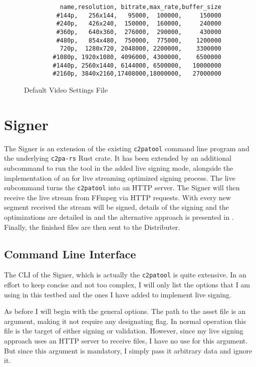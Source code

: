 \begin{figure}
    \centering
    \begin{lstlisting}
          name,resolution, bitrate,max_rate,buffer_size
         #144p,   256x144,   95000,  100000,     150000
         #240p,   426x240,  150000,  160000,     240000
         #360p,   640x360,  276000,  290000,     430000
         #480p,   854x480,  750000,  775000,    1200000
          720p,  1280x720, 2048000, 2200000,    3300000
        #1080p, 1920x1080, 4096000, 4300000,    6500000
        #1440p, 2560x1440, 6144000, 6500000,   10000000
        #2160p, 3840x2160,17408000,18000000,   27000000
    \end{lstlisting}
    \caption{Default Video Settings File}
    \label{list:video}
\end{figure}

\section{Signer\label{sec:signer}}

The Signer is an extension of the existing \texttt{c2patool} command line program and the underlying \texttt{c2pa-rs} Rust crate. It has been extended by an additional subcommand to run the tool in the added live signing mode, alongside the implementation of an for live streaming optimized signing process. The live subcommand turns the \texttt{c2patool} into an HTTP server. The Signer will then receive the live stream from FFmpeg via HTTP requests. With every new segment received the stream will be signed, details of the signing and the optimizations are detailed in  and the alternative approach is presented in . Finally, the finished files are then sent to the Distributer.

\subsection{Command Line Interface\label{sec:cli_signer}}

The CLI of the Signer, which is actually the \texttt{c2patool} is quite extensive. In an effort to keep concise and not too complex, I will only list the options that I am using in this testbed and the ones I have added to implement live signing.

As before I will begin with the general options. The path to the asset file is an argument, making it not require any designating flag. In normal operation this file is the target of either signing or validation. However, since my live signing approach uses an HTTP server to receive files, I have no use for this argument. But since this argument is mandatory, I simply pass it arbitrary data and ignore it.

